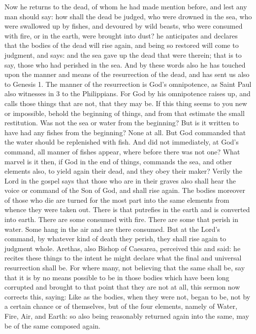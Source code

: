 Now he returns to the dead, of whom he had made mention before, and lest any man should say: how shall the dead be judged, who were drowned in the sea, who were swallowed up by fishes, and devoured by wild beasts, who were consumed with fire, or in the earth, were brought into dust? he anticipates and declares that the bodies of the dead will rise again, and being so restored will come to judgment, and says: and the sea gave up the dead that were therein; that is to say, those who had perished in the sea. And by these words also he has touched upon the manner and means of the resurrection of the dead, and has sent us also to Genesis 1. The manner of the resurrection is God’s omnipotence, as Saint Paul also witnesses in 3 to the Philippians. For God by his omnipotence raises up, and calls those things that are not, that they may be. If this thing seems to you new or impossible, behold the beginning of things, and from that estimate the small restitution. Was not the sea or water from the beginning? But is it written to have had any fishes from the beginning? None at all. But God commanded that the water should be replenished with fish. And did not immediately, at God’s command, all manner of fishes appear, where before there was not one? What marvel is it then, if God in the end of things, commands the sea, and other elements also, to yield again their dead, and they obey their maker? Verily the Lord in the gospel says that those who are in their graves also shall hear the voice or command of the Son of God, and shall rise again. The bodies moreover of those who die are turned for the most part into the same elements from whence they were taken out. There is that putrefies in the earth and is converted into earth. There are some consumed with fire. There are some that perish in water. Some hang in the air and are there consumed. But at the Lord’s command, by whatever kind of death they perish, they shall rise again to judgment whole. Arethas, also Bishop of Caesarea, perceived this and said: he recites these things to the intent he might declare what the final and universal resurrection shall be. For where many, not believing that the same shall be, say that it is by no means possible to be in those bodies which have been long corrupted and brought to that point that they are not at all, this sermon now corrects this, saying: Like as the bodies, when they were not, began to be, not by a certain chance or of themselves, but of the four elements, namely of Water, Fire, Air, and Earth: so also being reasonably returned again into the same, may be of the same composed again.

